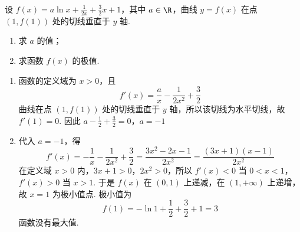 \begin{problem}
设 \( f(x)=a\ln x+\frac{1}{2x}+\frac{3}{2}x+1 \)，其中 \( a\in \R \)，曲线 \( y=f(x) \) 在点 \( (1,f(1)) \) 处的切线垂直于 \(y\) 轴.
\begin{enumerate}
\item 求 \(a\) 的值；
\item 求函数 \( f(x) \) 的极值.
\end{enumerate}
\begin{solution}
\begin{enumerate}
\item 函数的定义域为 \(x>0\)，且
\[
f'(x)=\frac{a}{x}-\frac{1}{2x^{2}}+\frac32
\]
曲线在点 \((1,f(1))\) 处的切线垂直于 \(y\) 轴，所以该切线为水平切线，故 \(f'(1)=0\). 因此
\(a-\frac12+\frac32=0\)，\(a=-1\)

\item 代入 \(a=-1\)，得
\[
f'(x)=-\frac1x-\frac{1}{2x^{2}}+\frac32
=\frac{3x^{2}-2x-1}{2x^{2}}
=\frac{(3x+1)(x-1)}{2x^{2}}
\]
在定义域 \(x>0\) 内，\(3x+1>0\)，\(2x^{2}>0\)，所以 \(f'(x)<0\) 当 \(0<x<1\)，\(f'(x)>0\) 当 \(x>1\). 于是 \(f(x)\) 在 \((0,1)\) 上递减，在 \((1,+\infty)\) 上递增，故 \(x=1\) 为极小值点. 极小值为
\[
f(1)=-\ln1+\frac12+\frac32+1=3
\]
函数没有最大值.
\end{enumerate}
\end{solution}
\end{problem}

